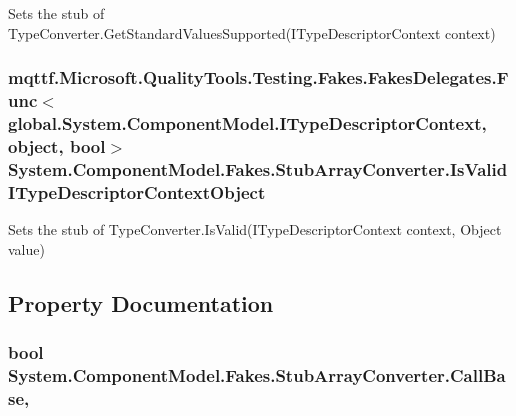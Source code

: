 Sets the stub of Type\-Converter.\-Get\-Standard\-Values\-Supported(\-I\-Type\-Descriptor\-Context context)

\hypertarget{class_system_1_1_component_model_1_1_fakes_1_1_stub_array_converter_a61157058ec19dfc701b41a4d80c0a4d1}{
\subsubsection[{Is\-Valid\-I\-Type\-Descriptor\-Context\-Object}]{\setlength{\rightskip}{0pt plus 5cm}mqttf.\-Microsoft.\-Quality\-Tools.\-Testing.\-Fakes.\-Fakes\-Delegates.\-Func$<$global.\-System.\-Component\-Model.\-I\-Type\-Descriptor\-Context, object, bool$>$ System.\-Component\-Model.\-Fakes.\-Stub\-Array\-Converter.\-Is\-Valid\-I\-Type\-Descriptor\-Context\-Object}}\label{class_system_1_1_component_model_1_1_fakes_1_1_stub_array_converter_a61157058ec19dfc701b41a4d80c0a4d1}


Sets the stub of Type\-Converter.\-Is\-Valid(\-I\-Type\-Descriptor\-Context context, Object value)



\subsection{Property Documentation}
\hypertarget{class_system_1_1_component_model_1_1_fakes_1_1_stub_array_converter_a6eb9adeb705f27e700417a3f5cd60673}{
\subsubsection[{Call\-Base}]{\setlength{\rightskip}{0pt plus 5cm}bool System.\-Component\-Model.\-Fakes.\-Stub\-Array\-Converter.\-Call\-Base\hspace{0.3cm}{\ttfamily [get]}, {\ttfamily [set]}}}\label{class_system_1_1_component_model_1_1_fakes_1_1_stub_array_converter_a6eb9adeb705f27e700417a3f5cd60673}


